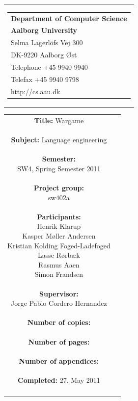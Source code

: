 \begin{nopagebreak}
\samepage 
\begin{tabular}{r}
\parbox{\textwidth}{
\hfill \parbox{6.2cm}{\begin{tabular}{l}
{\textsf\small \textbf{Department of Computer Science }}\\
{\textsf\small  \textbf{Aalborg University}}\\
{\textsf\small Selma Lagerlöfs Vej 300}\\
{\textsf\small DK-9220 Aalborg Øst}\\
{\textsf\small Telephone +45 9940 9940}\\
{\textsf\small Telefax +45 9940 9798}\\
{\textsf\small http://cs.aau.dk}
\end{tabular}}}
\end{tabular}

\begin{tabular}{cc}
\parbox{7cm}{
\textbf{Title:} 
Wargame\\ \\
\textbf{Subject:} 
Language engineering \\ \\
\textbf{Semester:} \\
SW4, Spring Semester 2011\\ \\
\textbf{Project group:} \\
sw402a\\ \\
\textbf{Participants:} \\
Henrik Klarup \\
Kasper Møller Andersen \\
Kristian Kolding Foged-Ladefoged \\
Lasse Rørbæk \\
Rasmus Aaen \\
Simon Frandsen \\ \\
\textbf{Supervisor:} \\
Jorge Pablo Cordero Hernandez \\ \\
\textbf{Number of copies:}
 \\ \\
\textbf{Number of pages:}
 \\ \\
\textbf{Number of appendices:}
 \\ \\
\textbf{Completed:}
27. May 2011 \\ \\
}


\end{tabular}
\end{nopagebreak}
